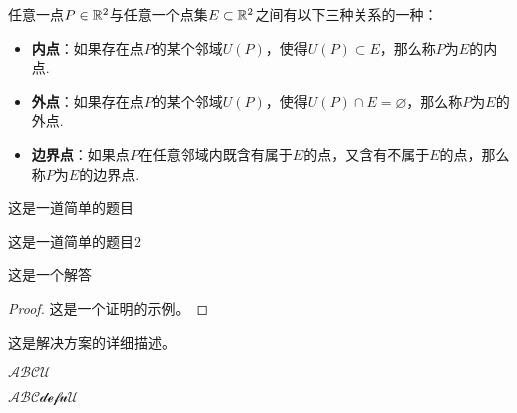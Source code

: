 \documentclass[12pt, a4paper, oneside, UTF8]{ctexbook}
\begin{document}
	
	任意一点$P \in \mathbb{R}^2$与任意一个点集$E \subset \mathbb{R}^2$之间有以下三种关系的一种：
	\begin{itemize}[leftmargin=45pt]
		\item \textbf{内点}：如果存在点$P$的某个邻域$U(P)$，使得$U(P) \subset E$，那么称$P$为$E$的内点.
		\item \textbf{外点}：如果存在点$P$的某个邻域$U(P)$，使得$U(P) \cap E = \varnothing$，那么称$P$为$E$的外点.
		\item \textbf{边界点}：如果点$P$在任意邻域内既含有属于$E$的点，又含有不属于$E$的点，那么称$P$为$E$的边界点.
	\end{itemize}
	
	\begin{problem}
		这是一道简单的题目
	\end{problem}
	
	\begin{problem}
		这是一道简单的题目2
	\end{problem}
	\begin{answer}
		这是一个解答
	\end{answer}
	
	\begin{proof}
		这是一个证明的示例。
	\end{proof}
	
	\begin{solution}
		这是解决方案的详细描述。
	\end{solution}

$\mathcal{A B C U}$ 

$\mathscr{ABCdef u U}$
	\ifx\allfiles\undefined
\end{document}
